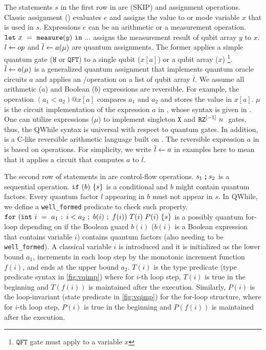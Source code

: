 The statements $s$ in the first row in  are \sskip (SKIP) and assignment operations.
Classic assignment () evaluates $e$ and assigns the value to \cmode or \mmode mode variable $x$ that is used in $s$.
Expressions $e$ can be an arithmetic or a measurement operation.
$\sexp{x}{\smea{y}}{...}$ assigns the measurement result of qubit array $y$ to $x$.
$\ssassign{l}{}{op}$ and $\ssassign{\overline{l}}{}{a(\mu)}$ are quantum assignments.
The former applies a simple quantum gate ($\texttt{H}$ or $\texttt{QFT}$)
to a single qubit ($x[a]$) or a qubit array ($x$) \footnote{$\texttt{QFT}$ gate must apply to a variable $x$}.
$\ssassign{\overline{l}}{}{a(\mu)}$ is a generalized quantum assignment that implements quantum oracle circuits $a$ and applies an \oqasm/\sourcelang operation on a list of qubit array $\overline{l}$.
We assume all arithmetic ($a$) and Boolean ($b$) expressions are reversible.
For example, the operation $(a_1 < a_2) @ x[a]$ compares $a_1$ and $a_2$ and stores the value in $x[a]$.
$\mu$ is the circuit implementation of the expression $a$ in \oqasm, whose syntax is given in .
One can utilize \oqasm expressions ($\mu$) to implement singleton $\texttt{X}$ and $\irz[\lbrack -1 \rbrack]{n}{}$ gates,
thus, the QWhile syntax is universal with respect to quantum gates.
In addition, \sourcelang is a C-like reversible arithmetic language built on \oqasm.
The reversible expression $a$ in  is based on \sourcelang operations.
For simplicity, we write $\ssassign{\overline{l}}{}{a}$ in examples here to
mean that it applies a \sourcelang circuit that computes $a$ to $\overline{l}$.

The second row of statements in  are control-flow operations.
$\sseq{s_1}{s_2}$ is a sequential operation.
$\sifq{b}{s}$ is a conditional and $b$ might contain quantum factors.
Every quantum factor $l$ appearing in $b$ must not appear in $s$.
In QWhile, we define a \texttt{well\_formed} predicate to check such property.
$\sqwhile{\sinit{i}{a_1}}{i<a_2}{b(i)}{f(i)}{T(i)}{P(i)}{s}$ is a possibly quantum for-loop depending on if the Boolean guard $b(i)$ ($b(i)$ is a Boolean expression that contains variable $i$) contains quantum factors (also needing to be \texttt{well\_formed}).
A classical variable $i$ is introduced and it is initialized as the lower bound $a_1$, increments in each loop step by the monotonic increment function $f(i)$, and ends at the upper bound $a_2$.
$T(i)$ is the type predicate (type predicate syntax in \cref{fig:vqimp}) where for $i$-th loop step,
$T(i)$ is true in the beginning and $T(f(i))$ is maintained after the execution.
Similarly, $P(i)$ is the loop-invariant (state predicate in \cref{fig:vqimp}) for the for-loop structure, where for $i$-th loop step,
$P(i)$ is true in the beginning and $P(f(i))$ is maintained after the execution. 

